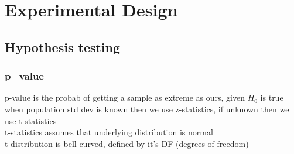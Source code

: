 \documentclass{beamer}
\begin{document}

\section{Experimental Design}

\subsection{Hypothesis testing}

\begin{frame}\frametitle{p\_value}
p-value is the probab of getting a sample as extreme as ours, given $H_0$ is true\\
when population std dev is known then we use z-statistics, if unknown then we use t-statistics\\
t-statistics assumes that underlying distribution is normal\\
t-distribution is bell curved, defined by it's DF (degrees of freedom)\\

\end{frame}
\end{document}
